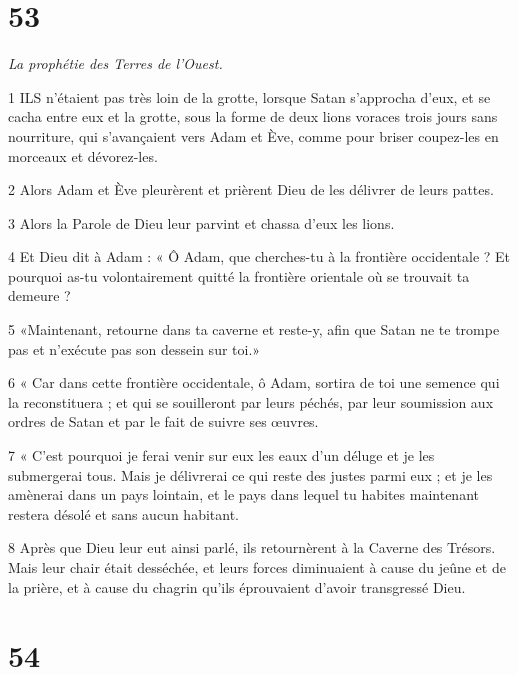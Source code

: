 \chapter{53}

\par \textit{La prophétie des Terres de l'Ouest.}

\par 1 ILS n'étaient pas très loin de la grotte, lorsque Satan s'approcha d'eux, et se cacha entre eux et la grotte, sous la forme de deux lions voraces trois jours sans nourriture, qui s'avançaient vers Adam et Ève, comme pour briser coupez-les en morceaux et dévorez-les.

\par 2 Alors Adam et Ève pleurèrent et prièrent Dieu de les délivrer de leurs pattes.

\par 3 Alors la Parole de Dieu leur parvint et chassa d'eux les lions.

\par 4 Et Dieu dit à Adam : « Ô Adam, que cherches-tu à la frontière occidentale ? Et pourquoi as-tu volontairement quitté la frontière orientale où se trouvait ta demeure ?

\par 5 «Maintenant, retourne dans ta caverne et reste-y, afin que Satan ne te trompe pas et n'exécute pas son dessein sur toi.»

\par 6 « Car dans cette frontière occidentale, ô Adam, sortira de toi une semence qui la reconstituera ; et qui se souilleront par leurs péchés, par leur soumission aux ordres de Satan et par le fait de suivre ses œuvres.

\par 7 « C'est pourquoi je ferai venir sur eux les eaux d'un déluge et je les submergerai tous. Mais je délivrerai ce qui reste des justes parmi eux ; et je les amènerai dans un pays lointain, et le pays dans lequel tu habites maintenant restera désolé et sans aucun habitant.

\par 8 Après que Dieu leur eut ainsi parlé, ils retournèrent à la Caverne des Trésors. Mais leur chair était desséchée, et leurs forces diminuaient à cause du jeûne et de la prière, et à cause du chagrin qu'ils éprouvaient d'avoir transgressé Dieu.

\chapter{54}

